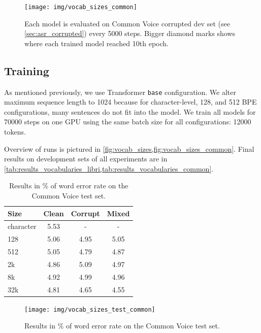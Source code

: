 \begin{figure}[p]
	\texttt{[image: img/vocab\_sizes\_common]}
	\caption{Each model is evaluated on Common Voice corrupted dev set (see \cref{sec:asr_corrupted}) every 5000 steps. Bigger diamond marks shows where each trained model reached 10th epoch.}
	\label{fig:vocab_sizes_common}
\end{figure}


\subsection{Training}

As mentioned previously, we use Transformer \texttt{base} configuration. We alter maximum sequence length to 1024 because for character-level, 128, and 512 BPE configurations, many sentences do not fit into the model. We train all models for 70000 steps on one GPU using the same batch size for all configurations: 12000 tokens. 

Overview of runs is pictured in \cref{fig:vocab_sizes,fig:vocab_sizes_common}. Final results on development sets of all experiments are in \cref{tab:results_vocabularies_libri,tab:results_vocabularies_common}.


\begin{table}[p]
	\centering
	\begin{tabular}{l|ccc}
		\bf Size & \bf Clean & \bf Corrupt & \bf Mixed \\
		\hline
		character    &    5.53    &    -    &    - \\
		128    &    5.06    &    4.95    &    5.05 \\
		512    &    5.05    &    4.79    &    4.87 \\
		2k    &    4.86    &    5.09    &    4.97 \\
		8k    &    4.92    &    4.99    &    4.96 \\
		32k    &    4.81    &    4.65    &    4.55 \\
		
	\end{tabular}
	
	\caption{Results in \% of word error rate on the Common Voice test set.}
	\label{tab:results_vocabularies_common_test}
\end{table}

\begin{figure}[p]
	\centering
	\texttt{[image: img/vocab\_sizes\_test\_common]}
	\caption{Results in \% of word error rate on the Common Voice test set.}
	\label{fig:vocab_sizes_common_graph}
\end{figure}


